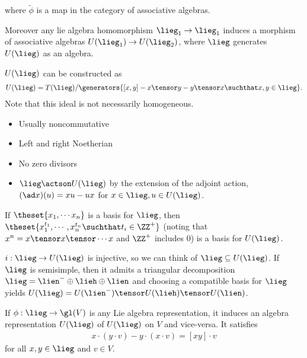 where \(\tilde \phi\) is a map in the category of associative algebras.

Moreover any lie algebra homomorphism \(\lieg_1 \to \lieg_1\) induces a
morphism of associative algebras \(U(\lieg_1) \to U(\lieg_2)\), where
\(\lieg\) generates \(U(\lieg)\) as an algebra.

\(U(\lieg)\) can be constructed as
\begin{align*}
U(\lieg) = T(\lieg)/ \generators{ [x,y] - x\tensor y - y\tensor x \suchthat x,y\in\lieg}
.\end{align*} Note that this ideal is not necessarily homogeneous.

\begin{proposition}

\envlist

\begin{itemize}
\tightlist
\item
  Usually noncommutative
\item
  Left and right Noetherian
\item
  No zero divisors
\item
  \(\lieg \actson U(\lieg)\) by the extension of the adjoint action,
  \((\ad x)(u) = xu - ux\) for \(x\in \lieg, u\in U(\lieg)\).
\end{itemize}

\end{proposition}

\begin{theorem}

If \(\theset{x_1, \cdots x_n}\) is a basis for \(\lieg\), then
\(\theset{x_1^{t_1}, \cdots, x_n^{t_n} \suchthat t_i \in \ZZ^+}\)
(noting that \(x^n = x\tensor x \tensor \cdots x\) and \(\ZZ^+\)
includes 0) is a basis for \(U(\lieg)\).

\end{theorem}

\begin{corollary}[?]

\(i:\lieg \to U(\lieg)\) is injective, so we can think of
\(\lieg \subseteq U(\lieg)\). If \(\lieg\) is semisimple, then it admits
a triangular decomposition \(\lieg = \lien^- \oplus \lieh \oplus \lien\)
and choosing a compatible basis for \(\lieg\) yields
\(U(\lieg) = U(\lien^-)\tensor U(\lieh) \tensor U(\lien)\).

If \(\phi: \lieg \to \gl(V)\) is any Lie algebra representation, it
induces an algebra representation \(U(\lieg)\) of \(U(\lieg)\) on \(V\)
and vice-versa. It satisfies
\begin{align*}x\cdot (y \cdot v) - y\cdot (x \cdot v) = [x y] \cdot v\end{align*}
for all \(x,y \in \lieg\) and \(v\in V\).

\end{corollary}

